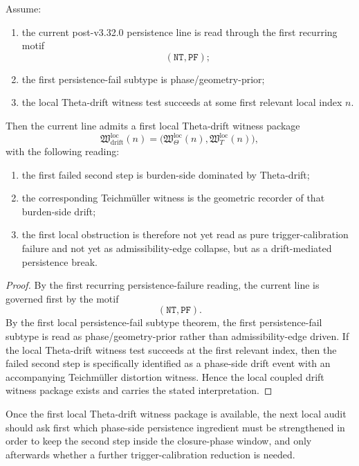 \begin{theorem}
\label{thm:first-local-theta-drift-witness-theorem}
Assume:
\begin{enumerate}
    \item the current post-v3.32.0 persistence line is read through the first recurring motif
    \[
    (\mathtt{NT},\mathtt{PF});
    \]
    \item the first persistence-fail subtype is phase/geometry-prior;
    \item the local Theta-drift witness test succeeds at some first relevant local index \(n\).
\end{enumerate}
Then the current line admits a first local Theta-drift witness package
\[
\mathfrak{W}_{\mathrm{drift}}^{\mathrm{loc}}(n)
=
\bigl(
\mathfrak{W}_{\Theta}^{\mathrm{loc}}(n),
\mathfrak{W}_{T}^{\mathrm{loc}}(n)
\bigr),
\]
with the following reading:
\begin{enumerate}
    \item the first failed second step is burden-side dominated by Theta-drift;
    \item the corresponding Teichm\"uller witness is the geometric recorder of that burden-side drift;
    \item the first local obstruction is therefore not yet read as pure trigger-calibration failure and not yet as admissibility-edge collapse, but as a drift-mediated persistence break.
\end{enumerate}
\end{theorem}

\begin{proof}
By the first recurring persistence-failure reading, the current line is governed first by the motif
\[
(\mathtt{NT},\mathtt{PF}).
\]
By the first local persistence-fail subtype theorem, the first persistence-fail subtype is read as phase/geometry-prior rather than admissibility-edge driven.
If the local Theta-drift witness test succeeds at the first relevant index, then the failed second step is specifically identified as a phase-side drift event with an accompanying Teichm\"uller distortion witness.
Hence the local coupled drift witness package exists and carries the stated interpretation.
\end{proof}

\begin{corollary}
\label{cor:current-post-r19-drift-diagnosis-rule}
Once the first local Theta-drift witness package is available, the next local audit should ask first which phase-side persistence ingredient must be strengthened in order to keep the second step inside the closure-phase window, and only afterwards whether a further trigger-calibration reduction is needed.
\end{corollary}


